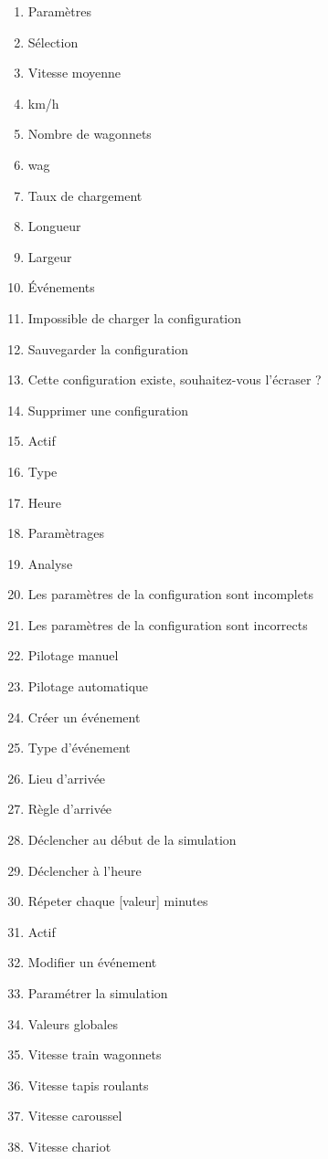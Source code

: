 \begin{enumerate}
	\item Paramètres \urt
	\item Sélection \urt
	\item Vitesse moyenne \urt
	\item km/h \urt
	\item Nombre de wagonnets \urt
	\item wag \urt
	\item Taux de chargement \urt
	\item Longueur \urt
	\item Largeur \urt
	\item Événements
	\item Impossible de charger la configuration \urt
	\item Sauvegarder la configuration \urt
	\item Cette configuration existe, souhaitez-vous l'écraser ? \urt
	\item Supprimer une configuration \urt
	\item Actif
	\item Type
	\item Heure
	\item Paramètrages
	\item Analyse
	\item Les paramètres de la configuration sont incomplets \urt
	\item Les paramètres de la configuration sont incorrects \urt
	\item Pilotage manuel
	\item Pilotage automatique
	\item Créer un événement
	\item Type d'événement
	\item Lieu d'arrivée
	\item Règle d'arrivée
	\item Déclencher au début de la simulation
	\item Déclencher à l'heure
	\item Répeter chaque [valeur] minutes
	\item Actif
	\item Modifier un événement
	\item Paramétrer la simulation
	\item Valeurs globales
	\item Vitesse train wagonnets
	\item Vitesse tapis roulants
	\item Vitesse caroussel
	\item Vitesse chariot

\end{enumerate}
